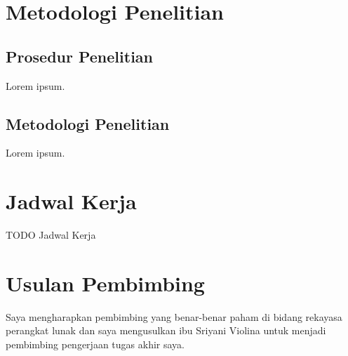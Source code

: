 \documentclass[a4paper, 12pt]{report}
\begin{document}
\section*{Metodologi Penelitian}

\subsection*{Prosedur Penelitian}
\begin{flushleft}
Lorem ipsum.
\end{flushleft}

\subsection*{Metodologi Penelitian}
\begin{flushleft}
Lorem ipsum.
\end{flushleft}

\section*{Jadwal Kerja}
\onehalfspacing 
\begin{flushleft}
TODO Jadwal Kerja
\end{flushleft}

\section*{Usulan Pembimbing}
\onehalfspacing Saya mengharapkan pembimbing yang benar-benar paham di bidang rekayasa perangkat lunak dan saya mengusulkan ibu Sriyani Violina untuk menjadi pembimbing pengerjaan tugas akhir saya.
\end{document}
